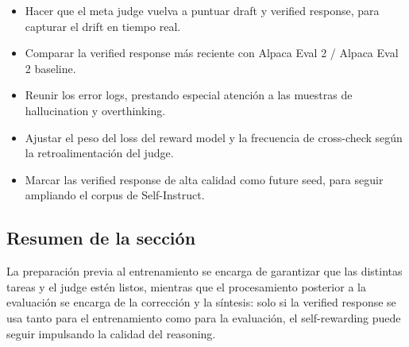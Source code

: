 \begin{itemize}
    \item Hacer que el meta judge vuelva a puntuar draft y verified response, para capturar el drift en tiempo real.
    \item Comparar la verified response más reciente con Alpaca Eval 2 / Alpaca Eval 2 baseline.
    \item Reunir los error logs, prestando especial atención a las muestras de hallucination y overthinking.
    \item Ajustar el peso del loss del reward model y la frecuencia de cross-check según la retroalimentación del judge.
    \item Marcar las verified response de alta calidad como future seed, para seguir ampliando el corpus de Self-Instruct.
\end{itemize}

\subsection{Resumen de la sección}
La preparación previa al entrenamiento se encarga de garantizar que las distintas tareas y el judge estén listos, mientras que el procesamiento posterior a la evaluación se encarga de la corrección y la síntesis: solo si la verified response se usa tanto para el entrenamiento como para la evaluación, el self-rewarding puede seguir impulsando la calidad del reasoning.

